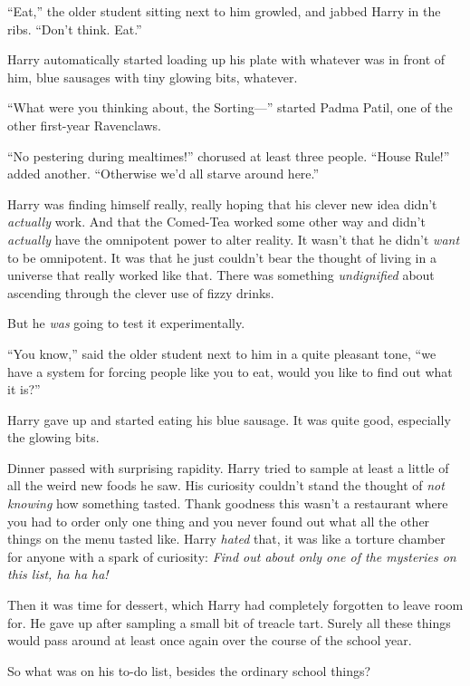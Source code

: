 “Eat,” the older student sitting next to him growled, and jabbed Harry in the ribs. “Don’t think. Eat.”

Harry automatically started loading up his plate with whatever was in front of him, blue sausages with tiny glowing bits, whatever.

“What were you thinking about, the Sorting—” started Padma Patil, one of the other first-year Ravenclaws.

“No pestering during mealtimes!” chorused at least three people. “House Rule!” added another. “Otherwise we’d all starve around here.”

Harry was finding himself really, really hoping that his clever new idea didn’t \emph{actually} work. And that the Comed-Tea worked some other way and didn’t \emph{actually} have the omnipotent power to alter reality. It wasn’t that he didn’t \emph{want} to be omnipotent. It was that he just couldn’t bear the thought of living in a universe that really worked like that. There was something \emph{undignified} about ascending through the clever use of fizzy drinks.

But he \emph{was} going to test it experimentally.

“You know,” said the older student next to him in a quite pleasant tone, “we have a system for forcing people like you to eat, would you like to find out what it is?”

Harry gave up and started eating his blue sausage. It was quite good, especially the glowing bits.

Dinner passed with surprising rapidity. Harry tried to sample at least a little of all the weird new foods he saw. His curiosity couldn’t stand the thought of \emph{not knowing} how something tasted. Thank goodness this wasn’t a restaurant where you had to order only one thing and you never found out what all the other things on the menu tasted like. Harry \emph{hated} that, it was like a torture chamber for anyone with a spark of curiosity: \emph{Find out about only one of the mysteries on this list, ha ha ha!}

Then it was time for dessert, which Harry had completely forgotten to leave room for. He gave up after sampling a small bit of treacle tart. Surely all these things would pass around at least once again over the course of the school year.

So what was on his to-do list, besides the ordinary school things?

